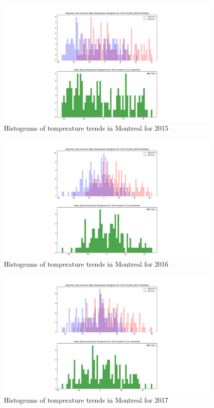 \documentclass[12pt]{article}
\begin{document}
\begin{figure}[!htbp]
\centering
\includegraphics[width=1.0\textwidth]{./docs/histogram2015.png} 
\caption{\scriptsize Histograms of temperature trends in Montreal for 2015}
\label{hist2015}		  
\end{figure}

\begin{figure}[!htbp]
\centering
\includegraphics[width=1.0\textwidth]{./docs/histogram2016.png} 
\caption{\scriptsize Histograms of temperature trends in Montreal for 2016}
\label{hist2016}		  
\end{figure}

\begin{figure}[!htbp]
\centering
\includegraphics[width=1.0\textwidth]{./docs/histogram2017.png} 
\caption{\scriptsize Histograms of temperature trends in Montreal for 2017}
\label{hist2017}		  
\end{figure}
\end{document}
